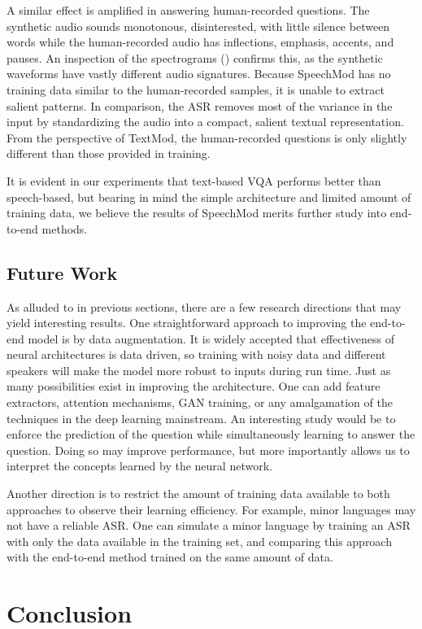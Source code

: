 \documentclass[letterpaper]{article} %
\begin{document}
A similar effect is amplified in answering human-recorded questions. The synthetic audio sounds monotonous, disinterested, with little silence between words while the human-recorded audio has inflections, emphasis, accents, and pauses. An inspection of the spectrograms () confirms this, as the synthetic waveforms have vastly different audio signatures. Because SpeechMod has no training data similar to the human-recorded samples, it is unable to extract salient patterns. In comparison, the ASR removes most of the variance in the input by standardizing the audio into a compact, salient textual representation. From the perspective of TextMod, the human-recorded questions is only slightly different than those provided in training.

It is evident in our experiments that text-based VQA performs better than speech-based, but bearing in mind the simple architecture and limited amount of training data, we believe the results of SpeechMod merits further study into end-to-end methods.


\subsection{Future Work}
As alluded to in previous sections, there are a few research directions that may yield interesting results. One straightforward approach to improving the end-to-end model is by data augmentation. It is widely accepted that effectiveness of neural architectures is data driven, so training with noisy data and different speakers will make the model more robust to inputs during run time. Just as many possibilities exist in improving the architecture. One can add feature extractors, attention mechanisms, GAN training, or any amalgamation of the techniques in the deep learning mainstream. An interesting study would be to enforce the prediction of the question while simultaneously learning to answer the question. Doing so may improve performance, but more importantly allows us to interpret the concepts learned by the neural network.

Another direction is to restrict the amount of training data available to both approaches to observe their learning efficiency. For example, minor languages may not have a reliable ASR. One can simulate a minor language by training an ASR with only the data available in the training set, and comparing this approach with the end-to-end method trained on the same amount of data.


\section{Conclusion}
\end{document}
